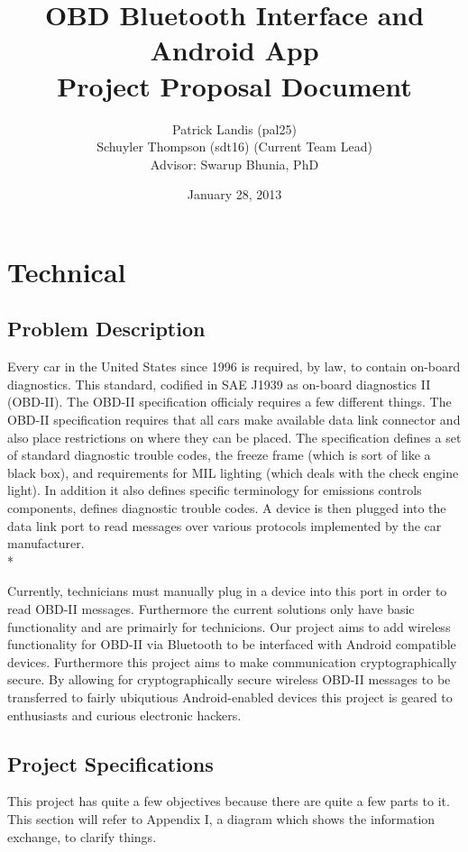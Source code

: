 \documentclass[12pt,letterpaper]{article}
\title{
\textbf{\LARGE OBD Bluetooth Interface and Android App} \\
\Large Project Proposal Document
}
\author{
\normalsize Patrick Landis (pal25) \\
\normalsize Schuyler Thompson (sdt16) (Current Team Lead) \\
\normalsize Advisor: Swarup Bhunia, PhD
}
\date{\normalsize January 28, 2013}
\begin{document}
\maketitle

\newpage

\section{Technical}
\subsection{Problem Description}
Every car in the United States since 1996 is required, by law, to contain on-board diagnostics. This standard, codified in SAE J1939 as on-board diagnostics II (OBD-II). The OBD-II specification officialy requires a few different things. The OBD-II specification requires that all cars make available data link connector and also place restrictions on where they can be placed. The specification defines a set of standard diagnostic trouble codes, the freeze frame (which is sort of like a black box), and requirements for MIL lighting (which deals with the check engine light). In addition it also defines specific terminology for emissions controls components, defines diagnostic trouble codes. A device is then plugged into the data link port to read messages over various protocols implemented by the car manufacturer. \\*

Currently, technicians must manually plug in a device into this port in order to read OBD-II messages. Furthermore the current solutions only have basic functionality and are primairly for technicions. Our project aims to add wireless functionality for OBD-II via Bluetooth to be interfaced with Android compatible devices. Furthermore this project aims to make communication cryptographically secure. By allowing for cryptographically secure wireless OBD-II messages to be transferred to fairly ubiqutious Android-enabled devices this project is geared to enthusiasts and curious electronic hackers.


\subsection{Project Specifications}
This project has quite a few objectives because there are quite a few parts to it. This section will refer to Appendix I, a diagram which shows the information exchange, to clarify things.
\end{document}
